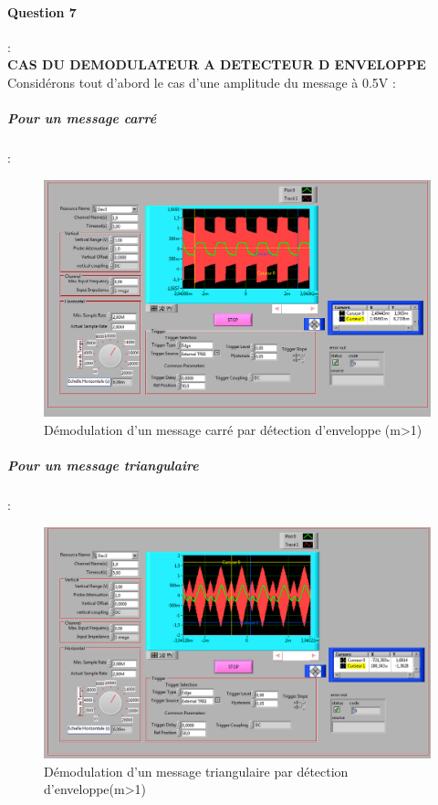 \documentclass[french]{article}
\begin{document}
\paragraph{Question 7} : \\

\textbf{CAS DU DEMODULATEUR A DETECTEUR D ENVELOPPE} \\
Considérons tout d'abord le cas d'une amplitude du message à 0.5V : 
\subparagraph{Pour un message carré} : \\
\begin{figure}[!h]
\includegraphics[width=\textwidth]{carre_enveloppe_05.png}
\caption{Démodulation d'un message carré par détection d'enveloppe (m>1)}
\end{figure}

\newpage
\subparagraph{Pour un message triangulaire} : \\
\begin{figure}[!h]
\includegraphics[width=\textwidth]{triangle_enveloppe_05.png}
\caption{Démodulation d'un message triangulaire par détection d'enveloppe(m>1)}
\end{figure}
\end{document}
